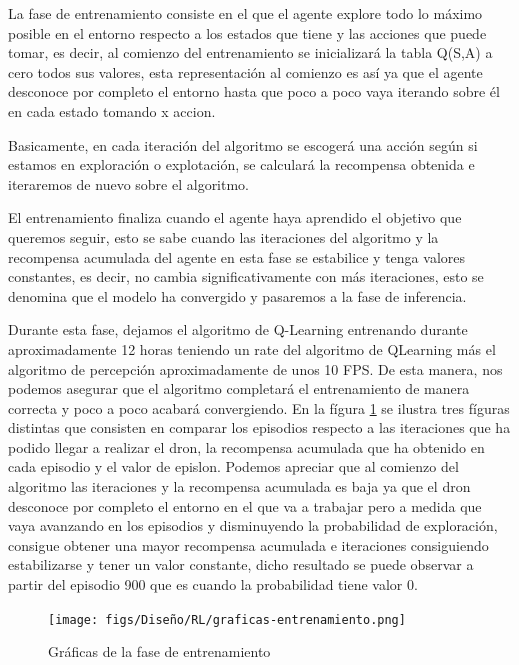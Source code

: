  
 La fase de entrenamiento consiste en el que el agente explore todo lo máximo posible en el entorno respecto a los estados que tiene y las acciones que puede tomar, es decir, al comienzo del entrenamiento se inicializará la tabla Q(S,A) a cero todos sus valores, esta representación
 al comienzo es así ya que el agente desconoce por completo el entorno hasta que poco a poco vaya iterando sobre él en cada estado tomando x accion. \newline
 
 Basicamente, en cada iteración del algoritmo se escogerá una acción según si estamos en exploración o explotación, se calculará la recompensa obtenida e iteraremos de nuevo sobre el algoritmo.

 El entrenamiento finaliza cuando el agente haya aprendido el objetivo que queremos seguir, esto se sabe cuando las iteraciones del algoritmo y la recompensa acumulada del agente en esta 
 fase se estabilice y tenga valores constantes, es decir, no cambia significativamente con más iteraciones, esto se denomina que el modelo ha convergido y pasaremos a la fase de inferencia. \newline

Durante esta fase, dejamos el algoritmo de Q-Learning entrenando durante aproximadamente 12 horas teniendo un rate del algoritmo de QLearning más el algoritmo de percepción aproximadamente de 
unos 10 FPS. De esta manera, nos podemos asegurar que el algoritmo completará el entrenamiento de manera correcta y poco a poco 
acabará convergiendo. En la fígura \ref{fig:entrenamiento} se ilustra tres fíguras distintas que consisten en comparar los episodios respecto a las iteraciones que ha podido 
llegar a realizar el dron, la recompensa acumulada que ha obtenido en cada episodio y el valor de epislon. Podemos apreciar que al comienzo del algoritmo las iteraciones y la recompensa
acumulada es baja ya que el dron desconoce por completo el entorno en el que va a trabajar pero a medida que vaya avanzando en los episodios y disminuyendo la probabilidad
de exploración, consigue obtener una mayor recompensa acumulada e iteraciones consiguiendo estabilizarse y tener un valor constante, dicho resultado se puede observar a partir 
del episodio 900 que es cuando la probabilidad tiene valor 0.

\begin{figure} [H]
  \begin{center}
    \texttt{[image: figs/Diseño/RL/graficas-entrenamiento.png]}
  \end{center}
  \caption{Gráficas de la fase de entrenamiento}
  \label{fig:entrenamiento}
\end{figure}\


